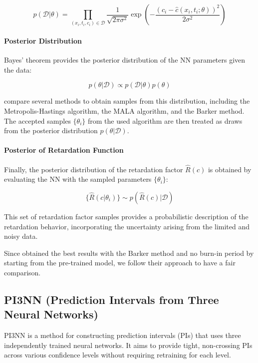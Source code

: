 \begin{equation}
p(\mathcal{D} | \theta) = \prod_{(x_i, t_i, c_i) \in \mathcal{D}} \frac{1}{\sqrt{2\pi \sigma^2}} \exp \left( -\frac{(c_i - \hat{c}(x_i, t_i; \theta))^2}{2\sigma^2} \right)
\label{eq:likelihood}
\end{equation}

\paragraph{Posterior Distribution}

Bayes' theorem provides the posterior distribution of the NN parameters given the data:


\begin{equation*}
p(\theta | \mathcal{D}) \propto p(\mathcal{D} | \theta) p(\theta)
\end{equation*}

\cite{finn} compare several methods to obtain samples from this distribution, including the Metropolis-Hastings algorithm, the MALA algorithm, and the Barker method. The accepted samples $\{\theta_i\}$ from the used algorithm are then treated as draws from the posterior distribution $p(\theta | \mathcal{D})$.

\paragraph{Posterior of Retardation Function}

Finally, the posterior distribution of the retardation factor $\hat{R}(c)$ is obtained by evaluating the NN with the sampled parameters $\{\theta_i\}$:

\begin{equation*}
\{\hat{R}(c | \theta_i)\} \sim p(\hat{R}(c) | \mathcal{D})
\end{equation*}

This set of retardation factor samples provides a probabilistic description of the retardation behavior, incorporating the uncertainty arising from the limited and noisy data.

Since \cite{finn} obtained the best results with the Barker method and no burn-in period by starting from the pre-trained model, we follow their approach to have a fair comparison.




\subsection{PI3NN (Prediction Intervals from Three Neural Networks)}
PI3NN \cite{pi3nn} is a method for constructing prediction intervals (PIs) that uses three independently trained neural networks. It aims to provide tight, non-crossing PIs across various confidence levels without requiring retraining for each level.


